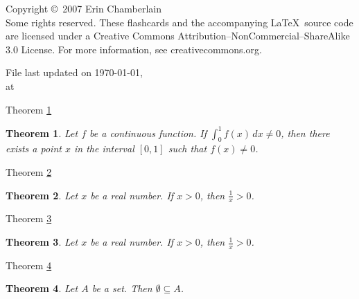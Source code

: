 \documentclass[avery5371,grid]{flashcards}
\newtheorem{theorem}{Theorem}
\begin{document}
\begin{flashcard}{Copyright \copyright \,
2007 Erin Chamberlain \\Some rights reserved.}
These flashcards and the accompanying \LaTeX \, source code are licensed
under a Creative Commons Attribution--NonCommercial--ShareAlike 3.0
License.  For more information, see creativecommons.org.

\medskip
\begin{center}
File last updated on \today, \\
at \currenttime
\end{center}
\end{flashcard}

\begin{flashcard}[Theorem]{Theorem \ref{thm01}}
\begin{theorem}
\label{thm01}
Let $f$ be a continuous function.  If $\int _0 ^1 f(x) \, dx \not= 0$,
then there exists a point $x$ in the interval $[0,1]$ such that
$f(x) \not= 0$.
\end{theorem}
\end{flashcard}

\begin{flashcard}[Theorem]{Theorem \ref{thm02}}
\begin{theorem}
\label{thm02}
Let $x$ be a real number.  If $x > 0$, then $\frac 1x > 0$.
\end{theorem}
\end{flashcard}

\begin{flashcard}[Theorem]{Theorem \ref{thm03}}
\begin{theorem}
\label{thm03}
Let $x$ be a real number.  If $x > 0$, then $\frac 1x > 0$.
\end{theorem}
\end{flashcard}

\begin{flashcard}[Theorem]{Theorem \ref{thm04}}
\begin{theorem}
\label{thm04}
Let $A$ be a set.  Then $\emptyset \subseteq A$.
\end{theorem}
\end{flashcard}
\end{document}
